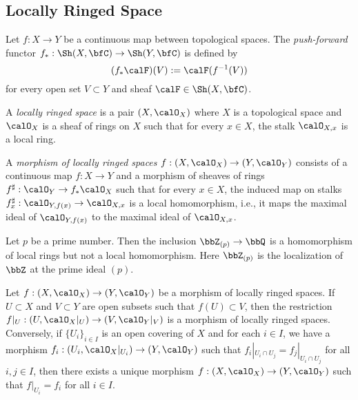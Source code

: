 

\subsection{Locally Ringed Space}

       \begin{definition}\label{def:push_forward_of_sheaves}
        Let \(f : X \to Y\) be a continuous map between topological spaces.
        The \emph{push-forward} functor \(f_* : \Sh(X, \bfC) \to \Sh(Y, \bfC)\) is defined by 
        \[
            (f_*\calF)(V) := \calF(f^{-1}(V))
        \]
        for every open set \(V \subset Y\) and sheaf \(\calF \in \Sh(X, \bfC)\).
    \end{definition}
    
    \begin{definition}\label{def:locally_ringed_space}
        A \emph{locally ringed space} is a pair \((X, \calO_X)\) where \(X\) is a topological space and \(\calO_X\) is a sheaf of rings on \(X\) such that for every \(x \in X\), the stalk \(\calO_{X,x}\) is a local ring.
        
        A \emph{morphism of locally ringed spaces} \(f : (X, \calO_X) \to (Y, \calO_Y)\) consists of a continuous map \(f : X \to Y\) and a morphism of sheaves of rings \(f^\sharp : \calO_Y \to f_*\calO_X\) 
        such that for every \(x \in X\), the induced map on stalks \(f_x^\sharp : \calO_{Y,f(x)} \to \calO_{X,x}\) is a local homomorphism, 
        i.e., it maps the maximal ideal of \(\calO_{Y,f(x)}\) to the maximal ideal of \(\calO_{X,x}\).
    \end{definition}

    \begin{example}\label{eg:non_local_homomorphism_of_local_rings}
        Let \(p\) be a prime number.
        Then the inclusion \(\bbZ_{(p)} \to \bbQ\) is a homomorphism of local rings but not a local homomorphism.
        Here \(\bbZ_{(p)}\) is the localization of \(\bbZ\) at the prime ideal \((p)\).
    \end{example}

    \begin{example}\label{eg:glue_morphisms_of_locally_ringed_spaces}
        Let \(f : (X, \calO_X) \to (Y, \calO_Y)\) be a morphism of locally ringed spaces.
        If \(U \subset X\) and \(V \subset Y\) are open subsets such that \(f(U) \subset V\), then the restriction \(f|_U : (U, \calO_X|_U) \to (V, \calO_Y|_V)\) is a morphism of locally ringed spaces.
        Conversely, if \(\{U_i\}_{i \in I}\) is an open covering of \(X\) and for each \(i \in I\), we have a morphism \(f_i : (U_i, \calO_X|_{U_i}) \to (Y, \calO_Y)\) such that \(f_i|_{U_i \cap U_j} = f_j|_{U_i \cap U_j}\) for all \(i,j \in I\),
        then there exists a unique morphism \(f : (X, \calO_X) \to (Y, \calO_Y)\) such that \(f|_{U_i} = f_i\) for all \(i \in I\).
    \end{example}

